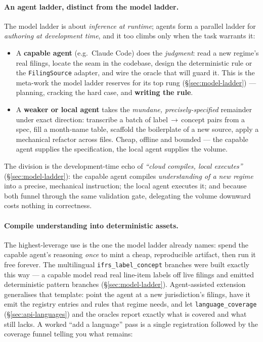 \documentclass[11pt,a4paper]{report}
\begin{document}
\paragraph{An agent ladder, distinct from the model ladder.} The model ladder is about \emph{inference at
runtime}; agents form a parallel ladder for \emph{authoring at development time}, and it too climbs only when the
task warrants it:
\begin{itemize}[nosep]
  \item A \textbf{capable agent} (e.g.\ Claude Code) does the \emph{judgment}: read a new regime's real filings,
    locate the seam in the codebase, design the deterministic rule or the \texttt{FilingSource} adapter, and wire
    the oracle that will guard it. This is the meta-work the model ladder reserves for its top rung
    (\S\ref{sec:model-ladder}) --- planning, cracking the hard case, and \textbf{writing the rule}.
  \item A \textbf{weaker or local agent} takes the \emph{mundane, precisely-specified} remainder under exact
    direction: transcribe a batch of label\,$\to$\,concept pairs from a spec, fill a month-name table, scaffold
    the boilerplate of a new source, apply a mechanical refactor across files. Cheap, offline and bounded --- the
    capable agent supplies the specification, the local agent supplies the volume.
\end{itemize}

\noindent The division is the development-time echo of \emph{``cloud compiles, local executes''}
(\S\ref{sec:model-ladder}): the capable agent compiles \emph{understanding of a new regime} into a precise,
mechanical instruction; the local agent executes it; and because both funnel through the same validation gate,
delegating the volume downward costs nothing in correctness.

\paragraph{Compile understanding into deterministic assets.} The highest-leverage use is the one the model
ladder already names: spend the capable agent's reasoning \emph{once} to mint a cheap, reproducible artifact,
then run it free forever. The multilingual \texttt{ifrs\_label\_concept} branches were built exactly this way ---
a capable model read real line-item labels off live filings and emitted deterministic pattern branches
(\S\ref{sec:model-ladder}). Agent-assisted extension generalises that template: point the agent at a new
jurisdiction's filings, have it emit the registry entries and rules that regime needs, and let
\texttt{language\_coverage} (\S\ref{sec:api-languages}) and the oracles report exactly what is covered and what
still lacks. A worked ``add a language'' pass is a single registration followed by the coverage funnel telling
you what remains:
\end{document}
